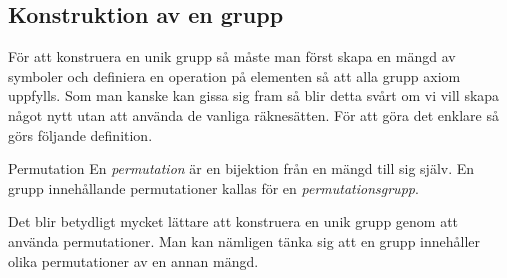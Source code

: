 \documentclass{article}
\theoremstyle{definition}
\begin{document}
\subsection{Konstruktion av en grupp}
För att konstruera en unik grupp så måste man först skapa en mängd av symboler och definiera 
en operation på elementen så att alla grupp axiom uppfylls.
Som man kanske kan gissa sig fram så blir detta svårt om vi vill skapa något nytt 
utan att använda de vanliga räknesätten. För att göra det enklare så görs följande definition.
\begin{mydef}{Permutation}{}
  En \textit{permutation} är en bijektion från en mängd till sig själv. En grupp innehållande 
  permutationer kallas för en \textit{permutationsgrupp}.
\end{mydef}
Det blir betydligt mycket lättare att konstruera en unik grupp genom att använda permutationer. 
Man kan nämligen tänka sig att en grupp innehåller olika permutationer av en annan mängd. 
\end{document}
